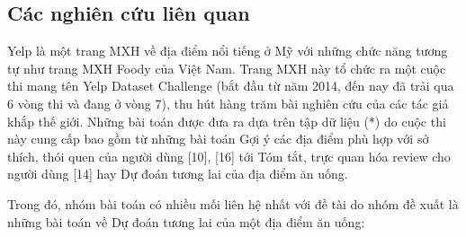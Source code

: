 \documentclass[12pt]{extarticle}
\begin{document}
		\subsection{Các nghiên cứu liên quan}
			\par Yelp là một trang MXH về địa điểm nổi tiếng ở Mỹ với những chức năng tương tự như trang MXH Foody của Việt Nam. Trang MXH này tổ chức ra một cuộc thi mang tên Yelp Dataset Challenge (bắt đầu từ năm 2014, đến nay đã trải qua 6 vòng thi và đang ở vòng 7), thu hút hàng trăm bài nghiên cứu của các tác giả khắp thế giới. Những bài toán được đưa ra dựa trên tập dữ liệu (*) do cuộc thi này cung cấp bao gồm từ những bài toán Gợi ý các địa điểm phù hợp với sở thích, thói quen của người dùng [10], [16] tới Tóm tắt, trực quan hóa review cho người dùng [14] hay Dự đoán tương lai của địa điểm ăn uống.
			\par Trong đó, nhóm bài toán có nhiều mối liên hệ nhất với đề tài do nhóm đề xuất là những bài toán về Dự đoán tương lai của một địa điểm ăn uống:
\end{document}
